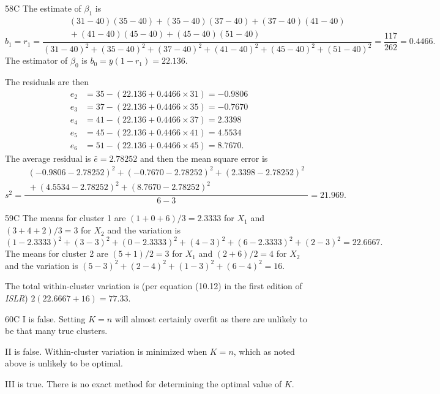 \begin{solution}{58}{C}
The estimate of $\beta_1$ is
\[ b_1 = r_1 = \dfrac{\begin{array}{c} (31-40)(35-40) + (35-40)(37-40) + (37-40)(41-40) \\ {} + (41-40)(45-40) + (45-40)(51-40) \end{array}}{(31-40)^2 + (35-40)^2 + (37-40)^2 + (41-40)^2 + (45-40)^2 + (51-40)^2} = \frac{117}{262} = 0.4466. \]
The estimator of $\beta_0$ is $b_0 = \bar{y}(1 - r_1) = 22.136$.

The residuals are then
\begin{align*}
e_2 &= 35 - (22.136 + 0.4466 \times 31) = -0.9806 \\
e_3 &= 37 - (22.136 + 0.4466 \times 35) = -0.7670 \\
e_4 &= 41 - (22.136 + 0.4466 \times 37) = 2.3398 \\
e_5 &= 45 - (22.136 + 0.4466 \times 41) = 4.5534 \\
e_6 &= 51 - (22.136 + 0.4466 \times 45) = 8.7670.
\end{align*}
The average residual is $\bar{e} = 2.78252$ and then the mean square error is
\[ s^2 = \dfrac{\begin{array}{c} (-0.9806 - 2.78252)^2 + (-0.7670 - 2.78252)^2 + (2.3398 - 2.78252)^2 \\ {} + (4.5534 - 2.78252)^2 + (8.7670 - 2.78252)^2 \end{array}}{6 - 3} = 21.969. \]
\end{solution}

\begin{solution}{59}{C}
The means for cluster 1 are $(1 + 0 + 6)/3 = 2.3333$ for $X_1$ and $(3 + 4 + 2)/3 = 3$ for $X_2$ and the variation is
\[ (1 - 2.3333)^2 + (3-3)^2 + (0 - 2.3333)^2 + (4-3)^2 + (6 - 2.3333)^2 + (2-3)^2 = 22.6667. \]
The means for cluster 2 are $(5 + 1)/2 = 3$ for $X_1$ and $(2 + 6)/2 = 4$ for $X_2$ and the variation is $(5-3)^2 + (2-4)^2 + (1-3)^2 + (6-4)^2 = 16$.

The total within-cluster variation is (per equation (10.12) in the first edition of \textit{ISLR}) $2(22.6667 + 16) = 77.33$.
\end{solution}

\begin{solution}{60}{C}
I is false. Setting $K = n$ will almost certainly overfit as there are unlikely to be that many true clusters.

II is false. Within-cluster variation is minimized when $K = n$, which as noted above is unlikely to be optimal.

III is true. There is no exact method for determining the optimal value of $K$.
\end{solution}

